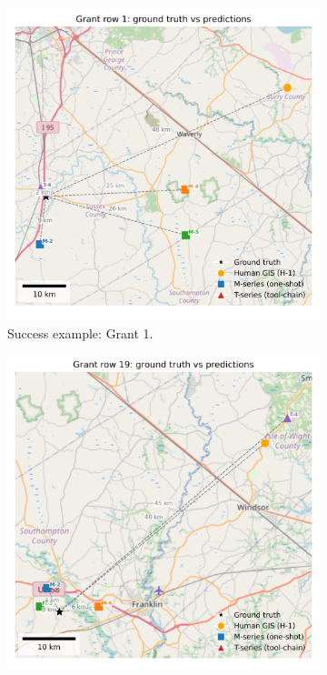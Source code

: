 \documentclass[
  10pt]{article}
\begin{document}
\begin{figure}[H]
\centering
\begin{subfigure}{0.48\textwidth}
  \centering
  \includegraphics[width=\linewidth]{map_outputs/grant_1_map.png}
  \caption{Success example: Grant 1.}
  \label{fig:grant1}
\end{subfigure}
\hfill %
\begin{subfigure}{0.48\textwidth}
  \centering
  \includegraphics[width=\linewidth]{map_outputs/grant_19_map.png}

\end{subfigure}
\end{figure}
\end{document}

